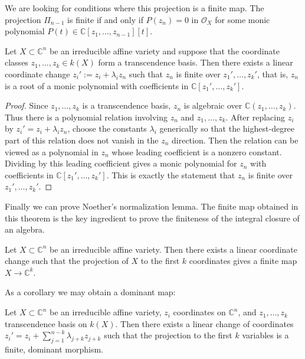 We are looking for conditions where
this projection is a finite map.
The projection $\Pi_{n-1}$ is finite
if and only if $P(z_n)=0$ in $\mathcal{O}_X$
for some monic polynomial
$P(t) \in \mathbb{C}[z_1,…,z_{n-1}][t]$.

\begin{lemma}
\label{lemma-coord-change-transcen-basis}
Let $X\subset \mathbb{C}^n$ be an irreducible
affine variety and suppose that the
coordinate
classes $z_1,\ldots,z_k \in k(X)$ form a
transcendence basis.
Then there exists a linear coordinate change
$z_i':=z_i+\lambda_iz_n$ such that $z_n$
is finite over $z_1',…,z_k'$,
that is, $z_n$ is a root of a monic
polynomial with coefficients in
$\mathbb{C}[z_1',…,z_k']$.
\end{lemma}

\begin{proof}
Since $z_1,\ldots,z_k$ is a transcendence
basis, $z_n$ is algebraic over
$\mathbb{C}(z_1,\ldots,z_k)$.
Thus there is a polynomial relation involving
$z_n$ and $z_1,\ldots,z_k$.
After replacing
$z_i$ by $z_i'=z_i+\lambda_i z_n$, choose the
constants $\lambda_i$ generically so that the
highest-degree part of this relation does not
vanish in the $z_n$ direction.
Then the relation can be viewed as a
polynomial in $z_n$ whose leading coefficient
is a nonzero constant.
Dividing by this leading coefficient gives a
monic polynomial for $z_n$ with coefficients
in $\mathbb{C}[z_1',\ldots,z_k']$.
This is exactly the statement that $z_n$ is
finite over $z_1',\ldots,z_k'$.
\end{proof}

\noindent
Finally we can prove Noether's normalization
lemma. The finite map obtained in this
theorem is the key ingredient
to prove the finiteness of the integral
closure of an algebra.

\begin{lemma}
\label{lemma-noether-normalization}
Let $X\subset \mathbb{C}^n$
be an irreducible affine variety.
Then there exists a linear coordinate
change such that the projection of $X$
to the first $k$ coordinates
gives a finite map $X \to \mathbb{C}^k$.
\end{lemma}

\noindent
As a corollary we may obtain a dominant map:

\begin{corollary}
\label{lemma-noether-nrmlztin-dominant}
Let $X \subset \mathbb{C}^n$
be an irreducible affine variety,
$z_i$ coordinates on $\mathbb{C}^n$,
and $z_1,…,z_k$ transcendence basis
on $k(X)$.
Then there exists a linear change of 
coordinates $z_i'=z_i+\sum_{j=1}^{n-k}
\lambda_{j+k}z_{j+k}$
such that the projection to the
first $k$ variables is a finite,
dominant morphism.
\end{corollary}

